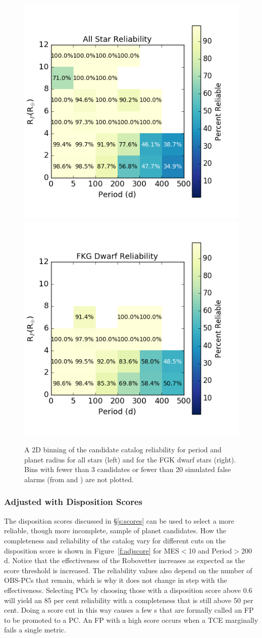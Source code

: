 \begin{figure}[h!]
\begin{center}
\includegraphics[width=0.45\linewidth]{fig-AllReliabilityPR.png}
\includegraphics[width=0.45\linewidth]{fig-FgkReliabilityPR.png}
\caption{A 2D binning of the candidate catalog reliability for period and planet radius for all stars (left) and for the FGK dwarf stars (right). Bins with fewer than 3 candidates or fewer than 20 simulated false alarms (from \invtce{} and \scrtce{}) are not plotted.}
\label{f:prReliability}
\end{center}
\end{figure}



\subsubsection{Adjusted with Disposition Scores}
\label{s:crscores}
The disposition scores discussed in \S\ref{s:scores} can be used to select a more reliable, though more incomplete, sample of planet candidates.  How the completeness and reliability of the catalog vary for different cuts on the disposition score is shown in Figure~\ref{f:adjscore} for MES$<$10 and Period$>$200\,d. 
Notice that the effectiveness of the Robovetter increases as expected as the score threshold is increased.  
The reliability values also depend on the number of OBS-PCs that remain, which is why it does not change in step with the effectiveness.
Selecting PCs by choosing those with a disposition score above 0.6 will yield an 85 per cent reliability with a completeness that is still above 50 per cent. Doing a score cut in this way causes a few \opstce s that are formally called an FP to be promoted to a PC. An FP with a high score occurs when a TCE marginally fails a single metric.

